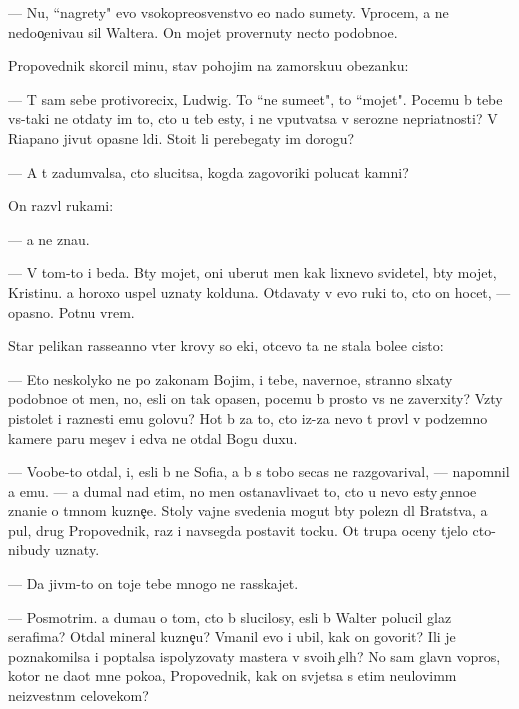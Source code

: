 \documentclass[10pt]{book}
\begin{document}
— Nu, ``nagrety" {\y}evo v{\yi}sokopreosv{\ia}{\x}enstvo {\y}e{\x}o nado sumety. Vprocem, {\y}a ne nedoo{\c}eniva{\y}u sil{\yi} Waltera. On mojet provernuty necto podobno{\y}e.

Propovednik skorcil minu, stav pohojim na zamorsku{\y}u obez{\y}anku:

— T{\yi} sam sebe protivorecix, Ludwig. To ``ne sume{\y}et", to ``mojet". Pocemu b{\yi} tebe vs{\e}-taki ne otdaty im to, cto u teb{\ia} {\y}esty, i ne vput{\yi}vatsa v ser{\y}ozn{\yi}{\y}e nepri{\y}atnosti? V Riapano jivut opasn{\yi}{\y}e l{\iu}di. Sto{\y}it li perebegaty im dorogu?

— A t{\yi} zadum{\yi}valsa, cto slucitsa, kogda zagovor{\x}iki polucat kamni?

On razv{\e}l rukami:

— {\Y}a ne zna{\y}u.

— V tom-to i beda. B{\yi}ty mojet, oni uberut men{\ia} kak lixnevo svidetel{\ia}, b{\yi}ty mojet, Kristinu. {\Y}a horoxo uspel uznaty kolduna. Otdavaty v {\y}evo ruki to, cto on hocet, — opasno. Pot{\ia}nu vrem{\ia}.

Star{\yi}{\y} pelikan rasse{\y}anno v{\yi}ter krovy so {\x}eki, otcevo ta ne stala bole{\y}e cisto{\y}:

— Eto neskolyko ne po zakonam Boj{\yf}im, i tebe, naverno{\y}e, stranno sl{\yi}xaty podobno{\y}e ot men{\ia}, no, {\y}esli on tak opasen, pocemu b{\yi} prosto vs{\e} ne zaverxity? Vz{\ia}ty pistolet i raznesti {\y}emu golovu? Hot{\ia} b{\yi} za to, cto iz-za nevo t{\yi} prov{\e}l v podzemno{\y} kamere paru mes{\ia}{\c}ev i {\y}edva ne otdal Bogu duxu.

— Voob{\x}e-to otdal, i, {\y}esli b{\yi} ne Sofi{\y}a, {\y}a b{\yi} s tobo{\y} se{\y}cas ne razgovarival, — napomnil {\y}a {\y}emu. — {\Y}a dumal nad etim, no men{\ia} ostanavliva{\y}et to, cto u nevo {\y}esty {\c}enno{\y}e znani{\y}e o t{\e}mnom kuzne{\c}e. Stoly vajn{\yi}{\y}e svedeni{\y}a mogut b{\yi}ty polezn{\yi} dl{\ia} Bratstva, a pul{\ia}, drug Propovednik, raz i navsegda postavit tocku. Ot trupa oceny t{\ia}jelo cto-nibudy uznaty.

— Da jiv{\yi}m-to on toje tebe mnogo ne rasskajet.

— Posmotrim. {\Y}a duma{\y}u o tom, cto b{\yi} slucilosy, {\y}esli b{\yi} Walter polucil glaz serafima? Otdal mineral kuzne{\c}u? V{\yi}manil {\y}evo i ubil, kak on govorit? Ili je poznakomilsa i pop{\yi}talsa ispolyzovaty mastera v svo{\y}ih {\c}el{\ia}h? No sam{\yi}{\y} glavn{\yi}{\y} vopros, kotor{\yi}{\y} ne da{\y}ot mne poko{\y}a, Propovednik, kak on sv{\ia}jetsa s etim neulovim{\yi}m neizvestn{\yi}m celovekom?
\end{document}
